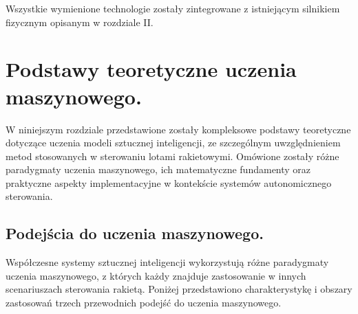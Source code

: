 Wszystkie wymienione technologie zostały zintegrowane z istniejącym
silnikiem fizycznym opisanym w rozdziale II.

\section{Podstawy teoretyczne uczenia maszynowego.}

W niniejszym rozdziale przedstawione zostały kompleksowe podstawy teoretyczne
dotyczące uczenia modeli sztucznej inteligencji, ze szczególnym
uwzględnieniem metod stosowanych w sterowaniu lotami rakietowymi. Omówione
zostały różne paradygmaty uczenia maszynowego, ich matematyczne fundamenty oraz praktyczne aspekty implementacyjne w kontekście systemów autonomicznego sterowania. \\


\subsection{Podejścia do uczenia maszynowego.}
\label{sec:rodzaje-uczenia-maszynowego.}

Współczesne systemy sztucznej inteligencji wykorzystują różne paradygmaty
uczenia maszynowego, z których każdy znajduje zastosowanie w innych
scenariuszach sterowania rakietą. Poniżej przedstawiono charakterystykę i
obszary zastosowań trzech przewodnich podejść do uczenia maszynowego. \cite{geron-hands-on} \\


